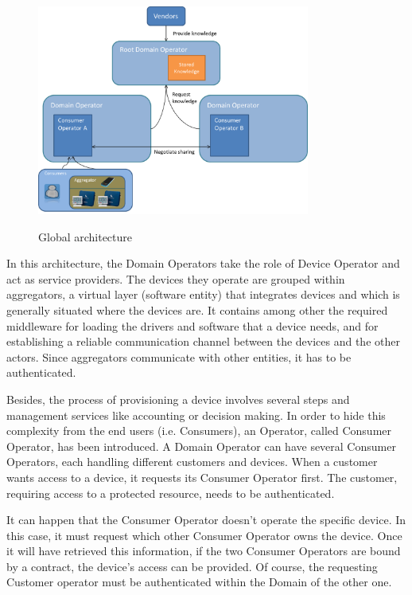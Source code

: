 \begin{figure}[!ht]
	\centering
	\includegraphics[width=0.8\textwidth]{images/design.png}\\
	\caption{Global architecture}
	\label{fig:concept__architecture}
\end{figure}

In this architecture, the Domain Operators take the role of Device Operator and act as service providers. The devices they operate are grouped within aggregators, a virtual layer (software entity) that integrates devices and which is generally situated where the devices are. It contains among other the required middleware for loading the drivers and software that a device needs, and for establishing a reliable communication channel between the devices and the other actors. Since aggregators communicate with other entities, it has to be authenticated.

Besides, the process of provisioning a device involves several steps and management services like accounting or decision making. In order to hide this complexity from the end users (i.e. Consumers), an Operator, called Consumer Operator, has been introduced. A Domain Operator can have several Consumer Operators, each handling different customers and devices. When a customer wants access to a device, it requests its Consumer Operator first. The customer, requiring access to a protected resource, needs to be authenticated. 

It can happen that the Consumer Operator doesn't operate the specific device. In this case, it must request which other Consumer Operator owns the device. Once it will have retrieved this information, if the two Consumer Operators are bound by a contract, the device's access can be provided. Of course, the requesting Customer operator must be authenticated within the Domain of the other one.

